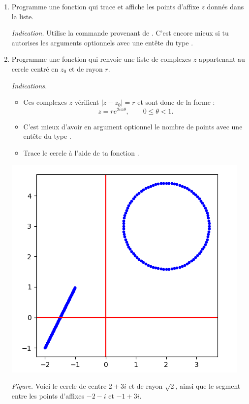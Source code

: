 \documentclass[11pt,class=report,crop=false]{standalone}
\begin{document}

\begin{activite}


\begin{enumerate}
  \item Programme une fonction  qui trace et affiche les points 
  d'affixe $z$ donnés dans la liste.
  
  \emph{Indication.} Utilise la commande  provenant de .
  C'est encore mieux si tu autorises les arguments optionnels avec une entête du type 
  .
  
  
  \item Programme une fonction  qui renvoie une liste de complexes $z$ appartenant au cercle centré en $z_0$ et de rayon $r$.
  
  \emph{Indications.}
  \begin{itemize} 
    \item Ces complexes $z$ vérifient $|z-z_0|=r$ et sont donc de la forme :
    $$z = r e^{2i\pi\theta}, \qquad 0 \le \theta < 1.$$
    \item C'est mieux d'avoir en argument optionnel le nombre de points avec une entête du type .
    
    \item Trace le cercle à l'aide de ta fonction .
   \end{itemize} 
   
  
\begin{center}
\includegraphics[scale=\myscale,scale=0.5]{ecran-complexes2-4}
\end{center}
\emph{Figure.} Voici le cercle de centre $2+3i$ et de rayon $\sqrt2$, ainsi que le segment entre les points d'affixes $-2-i$ et $-1+3i$.
 

\end{enumerate}
\end{activite}
\end{document}
